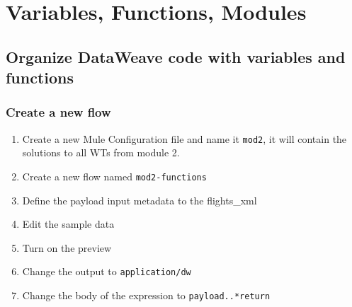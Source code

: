 \chapter{Variables, Functions, Modules}

\section{Organize DataWeave code with variables and functions}

\subsection{Create a new flow}
\begin{enumerate}
\item Create a new Mule Configuration file and name it \texttt{mod2}, it will contain the solutions to all WTs from module 2.
\item Create a new flow named \texttt{mod2-functions}
\item Define the payload input metadata to the flights\_xml
\item Edit the sample data
\item Turn on the preview
\item Change the output to \texttt{application/dw}
\item Change the body of the expression to \texttt{payload..*return}
\end{enumerate}

